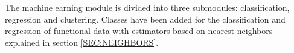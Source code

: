 The machine earning module is divided into three submodules: classification,
regression and clustering. Classes have been added for the classification and
regression of functional data with estimators based on nearest neighbors
explained in section \ref{SEC:NEIGHBORS}.
